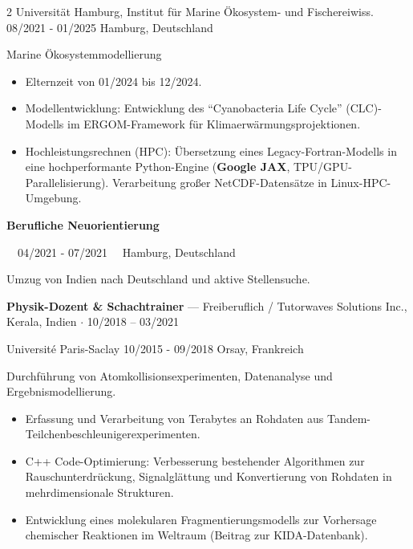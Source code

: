 \documentclass{thejus_cv}
\begin{document}
\begin{paracol}{2}
             {Universit\"at Hamburg, Institut f\"ur Marine \"Okosystem- und Fischereiwiss.}
             {08/2021 - 01/2025}
             {Hamburg, Deutschland}
             {Marine \"Okosystemmodellierung
             \begin{itemize}\setlength{\itemsep}{0pt}\setlength{\parskip}{0pt}
                 \item Elternzeit von 01/2024 bis 12/2024.
                 \item Modellentwicklung: Entwicklung des ``Cyanobacteria Life Cycle'' (CLC)-Modells im ERGOM-Framework f\"ur Klimaerw\"armungsprojektionen.
                 \item Hochleistungsrechnen (HPC): \"Ubersetzung eines Legacy-Fortran-Modells in eine hochperformante Python-Engine (\textbf{Google JAX}, TPU/GPU-Parallelisierung). Verarbeitung gro\ss{}er NetCDF-Datens\"atze in Linux-HPC-Umgebung.
             \end{itemize}\vspace{0.7em}}

\vspace{0.7em}
{\large\textbf{Berufliche Neuorientierung}}\par
{\small\color{cvgray}\faCalendar\ \ 04/2021 - 07/2021 \hspace{0.5cm} \faMapMarker\ \ Hamburg, Deutschland}\par
\vspace{0.2em}
{\color{cvlightgray}\hdashrule{\linewidth}{0.5pt}{1mm}}\par
\vspace{0.2em}
Umzug von Indien nach Deutschland und aktive Stellensuche.
\vspace{0.3em}

\textbf{Physik-Dozent \& Schachtrainer} --- Freiberuflich / Tutorwaves Solutions Inc., Kerala, Indien $\cdot$ 10/2018 -- 03/2021\par

             {Universit\'e Paris-Saclay}
             {10/2015 - 09/2018}
             {Orsay, Frankreich}
             {Durchf\"uhrung von Atomkollisionsexperimenten, Datenanalyse und Ergebnismodellierung.
             \begin{itemize}\setlength{\itemsep}{0pt}\setlength{\parskip}{0pt}
                 \item Erfassung und Verarbeitung von Terabytes an Rohdaten aus Tandem-Teilchenbeschleunigerexperimenten.
                 \item C++ Code-Optimierung: Verbesserung bestehender Algorithmen zur Rauschunterdr\"uckung, Signalgl\"attung und Konvertierung von Rohdaten in mehrdimensionale Strukturen.
                 \item Entwicklung eines molekularen Fragmentierungsmodells zur Vorhersage chemischer Reaktionen im Weltraum (Beitrag zur KIDA-Datenbank).
             \end{itemize}\vspace{-0.3em}}



\end{paracol}
\end{document}
